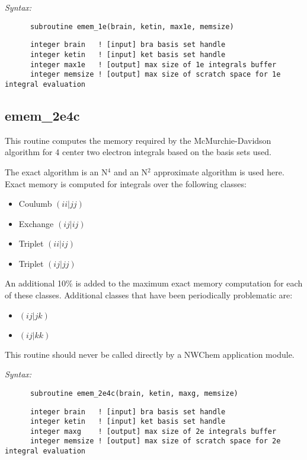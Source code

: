 {\it Syntax:} 
\begin{verbatim} 
      subroutine emem_1e(brain, ketin, max1e, memsize) 
\end{verbatim} 
\begin{verbatim} 
      integer brain   ! [input] bra basis set handle 
      integer ketin   ! [input] ket basis set handle 
      integer max1e   ! [output] max size of 1e integrals buffer 
      integer memsize ! [output] max size of scratch space for 1e integral evaluation 
\end{verbatim} 
\subsection{emem\_2e4c} 
This routine computes the memory required by the McMurchie-Davidson  
algorithm for 4 center two electron integrals based on the  
basis sets used.   
 
The exact algorithm is an N$^4$ and an N$^2$ approximate algorithm  
is used here.  Exact memory is computed for integrals over the  
following classes: 
\begin{itemize} 
\item Coulumb $(ii|jj)$ 
\item Exchange $(ij|ij)$ 
\item Triplet $(ii|ij)$ 
\item Triplet $(ij|jj)$ 
\end{itemize} 
An additional 10\% is added to the maximum exact memory  
computation for each of these classes.  Additional classes that  
have been periodically problematic are: 
\begin{itemize} 
\item $(ij|jk)$ 
\item $(ij|kk)$ 
\end{itemize} 
This routine should never be called directly by a  
NWChem application module. 
 
{\it Syntax:} 
\begin{verbatim} 
      subroutine emem_2e4c(brain, ketin, maxg, memsize) 
\end{verbatim} 
\begin{verbatim} 
      integer brain   ! [input] bra basis set handle 
      integer ketin   ! [input] ket basis set handle 
      integer maxg    ! [output] max size of 2e integrals buffer 
      integer memsize ! [output] max size of scratch space for 2e integral evaluation 
\end{verbatim} 
